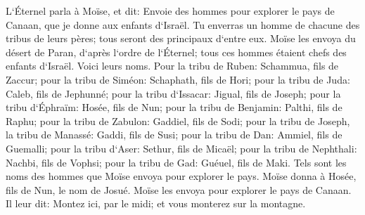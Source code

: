 \verse L`Éternel parla à Moïse, et dit: 
\verse Envoie des hommes pour explorer le pays de Canaan, que je donne aux enfants d`Israël. Tu enverras un homme de chacune des tribus de leurs pères; tous seront des principaux d`entre eux. 
\verse Moïse les envoya du désert de Paran, d`après l`ordre de l`Éternel; tous ces hommes étaient chefs des enfants d`Israël. 
\verse Voici leurs noms. Pour la tribu de Ruben: Schammua, fils de Zaccur; 
\verse pour la tribu de Siméon: Schaphath, fils de Hori; 
\verse pour la tribu de Juda: Caleb, fils de Jephunné; 
\verse pour la tribu d`Issacar: Jigual, fils de Joseph; 
\verse pour la tribu d`Éphraïm: Hosée, fils de Nun; 
\verse pour la tribu de Benjamin: Palthi, fils de Raphu; 
\verse pour la tribu de Zabulon: Gaddiel, fils de Sodi; 
\verse pour la tribu de Joseph, la tribu de Manassé: Gaddi, fils de Susi; 
\verse pour la tribu de Dan: Ammiel, fils de Guemalli; 
\verse pour la tribu d`Aser: Sethur, fils de Micaël; 
\verse pour la tribu de Nephthali: Nachbi, fils de Vophsi; 
\verse pour la tribu de Gad: Guéuel, fils de Maki. 
\verse Tels sont les noms des hommes que Moïse envoya pour explorer le pays. Moïse donna à Hosée, fils de Nun, le nom de Josué. 
\verse Moïse les envoya pour explorer le pays de Canaan. Il leur dit: Montez ici, par le midi; et vous monterez sur la montagne. 
